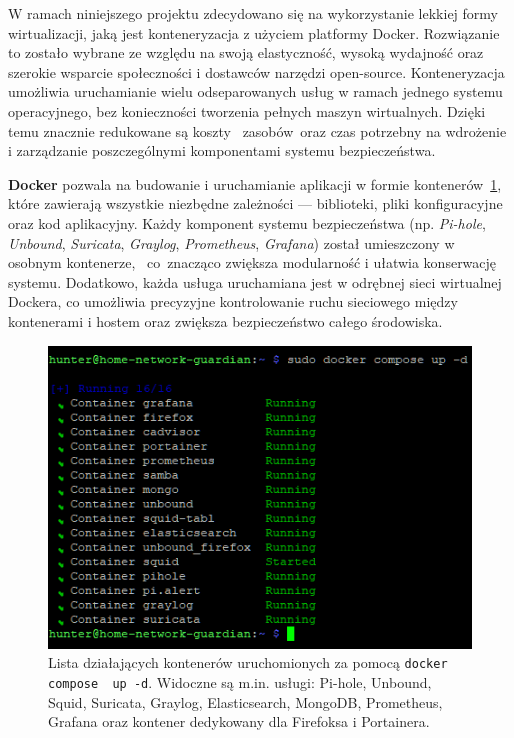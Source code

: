 \documentclass[
    left=2.5cm,         %
    right=2.5cm,        %
    top=2.5cm,          %
    bottom=3cm,         %
    bindingoffset=6mm,  %
    nohyphenation=true %
]{eiti/eiti-thesis} %
\begin{document}
W ramach niniejszego projektu zdecydowano się na wykorzystanie lekkiej formy wirtualizacji, jaką jest konteneryzacja z użyciem platformy Docker\cite{docker-wiki}. Rozwiązanie to zostało wybrane ze względu na swoją elastyczność, wysoką wydajność oraz szerokie wsparcie społeczności i dostawców narzędzi open-source. Konteneryzacja umożliwia uruchamianie wielu odseparowanych usług w ramach jednego systemu operacyjnego, bez konieczności tworzenia pełnych maszyn wirtualnych. Dzięki temu znacznie redukowane są koszty ~zasobów~oraz czas potrzebny na wdrożenie i zarządzanie poszczególnymi komponentami systemu bezpieczeństwa.

\textbf{Docker} pozwala na budowanie i uruchamianie aplikacji w formie kontenerów~\ref{fig:hunter-docker}, które zawierają wszystkie niezbędne zależności — biblioteki, pliki konfiguracyjne oraz kod aplikacyjny. Każdy komponent systemu bezpieczeństwa (np. \textit{Pi-hole}, \textit{Unbound}, \textit{Suricata}, \textit{Graylog}, \textit{Prometheus}, \textit{Grafana}) został umieszczony w osobnym kontenerze, ~co~znacząco zwiększa modularność i ułatwia konserwację systemu. Dodatkowo, każda usługa uruchamiana jest w odrębnej sieci wirtualnej Dockera, co umożliwia precyzyjne kontrolowanie ruchu sieciowego między kontenerami i hostem 
oraz zwiększa bezpieczeństwo całego środowiska.
\begin{figure}[H]
    \centering
    \includegraphics[width=\textwidth]{img/docker.png}
    \caption{Lista działających kontenerów uruchomionych za pomocą \texttt{docker compose ~up~-d}. Widoczne są m.in. usługi: Pi-hole, Unbound, Squid, Suricata, Graylog, Elasticsearch, MongoDB, Prometheus, Grafana oraz kontener dedykowany dla Firefoksa i Portainera.}
    \label{fig:hunter-docker}
\end{figure}
\end{document}
